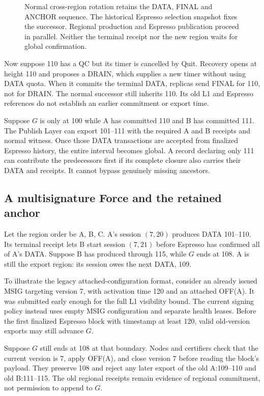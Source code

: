 \documentclass[11pt,a4paper]{article}
\begin{document}
\begin{figure}[htbp]\centering

\caption{Normal cross-region rotation retains the DATA, FINAL and
ANCHOR sequence. The historical Espresso selection snapshot fixes the
successor. Regional production and Espresso publication proceed in
parallel. Neither the terminal receipt nor the new region waits for
global confirmation.}
\label{fig:regular-cross-region}
\end{figure}
\FloatBarrier

Now suppose 110 has a QC but its timer is cancelled by Quit.
Recovery opens at height 110 and proposes a DRAIN, which supplies a
new timer without using DATA quota. When it commits the terminal DATA,
replicas send FINAL for 110, not for DRAIN. The normal successor still
inherits 110. Its old L1 and Espresso references do not establish an
earlier commitment or export time.

Suppose $G$ is only at 100 while A has committed 110 and B has committed
111. The Publish Layer can export 101--111 with the required A and B receipts
and normal witness. Once those DATA transactions are accepted from finalized
Espresso history, the entire interval becomes global. A record declaring
only 111 can contribute the predecessors first if its complete closure
also carries their DATA and receipts. It cannot bypass genuinely missing
ancestors.

\subsection{A multisignature Force and the retained anchor}
\label{sec:force-example}
Let the region order be A, B, C. A's session $(7,20)$ produces
DATA 101--110. Its terminal receipt lets B start session $(7,21)$
before Espresso has confirmed all of A's DATA. Suppose B has produced
through 115, while $G$ ends at 108. A is still the export region:
its session owes the next DATA, 109.

To illustrate the legacy attached-configuration format, consider an
already issued MSIG targeting version 7, with activation time 120 and
an attached OFF(A). It was submitted early enough for the full L1
visibility bound. The current signing policy instead uses empty MSIG
configuration and separate health leases. Before the first finalized Espresso
block with timestamp at least 120, valid old-version exports may still
advance $G$.

Suppose $G$ still ends at 108 at that boundary. Nodes and certifiers
check that the current version is 7, apply OFF(A), and close version 7
before reading the block's payload. They preserve 108 and reject any
later export of the old A:109--110 and old B:111--115. The old regional
receipts remain evidence of regional commitment, not permission to
append to $G$.
\end{document}
